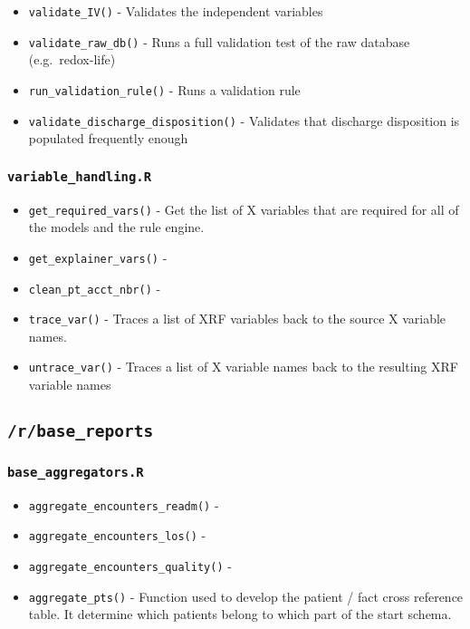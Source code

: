 \documentclass[
]{book}
\providecommand{\tightlist}{%
  \setlength{\itemsep}{0pt}\setlength{\parskip}{0pt}}
\begin{document}
\begin{itemize}
\tightlist
\item
  \texttt{validate\_IV()} - Validates the independent variables
\item
  \texttt{validate\_raw\_db()} - Runs a full validation test of the raw database (e.g.~redox-life)
\item
  \texttt{run\_validation\_rule()} - Runs a validation rule
\item
  \texttt{validate\_discharge\_disposition()} - Validates that discharge disposition is populated frequently enough
\end{itemize}

\hypertarget{variable_handling.r-1}{%
\subsubsection{\texorpdfstring{\texttt{variable\_handling.R}}{variable\_handling.R}}\label{variable_handling.r-1}}

\begin{itemize}
\tightlist
\item
  \texttt{get\_required\_vars()} - Get the list of X variables that are required for all of the models and the rule engine.
\item
  \texttt{get\_explainer\_vars()} -
\item
  \texttt{clean\_pt\_acct\_nbr()} -
\item
  \texttt{trace\_var()} - Traces a list of XRF variables back to the source X variable names.
\item
  \texttt{untrace\_var()} - Traces a list of X variable names back to the resulting XRF variable names
\end{itemize}

\hypertarget{rbase_reports}{%
\subsection{\texorpdfstring{\texttt{/r/base\_reports}}{/r/base\_reports}}\label{rbase_reports}}

\hypertarget{base_aggregators.r}{%
\subsubsection{\texorpdfstring{\texttt{base\_aggregators.R}}{base\_aggregators.R}}\label{base_aggregators.r}}

\begin{itemize}
\tightlist
\item
  \texttt{aggregate\_encounters\_readm()} -
\item
  \texttt{aggregate\_encounters\_los()} -
\item
  \texttt{aggregate\_encounters\_quality()} -
\item
  \texttt{aggregate\_pts()} - Function used to develop the patient / fact cross reference table. It determine which patients belong to which part of the start schema.
\end{itemize}
\end{document}
